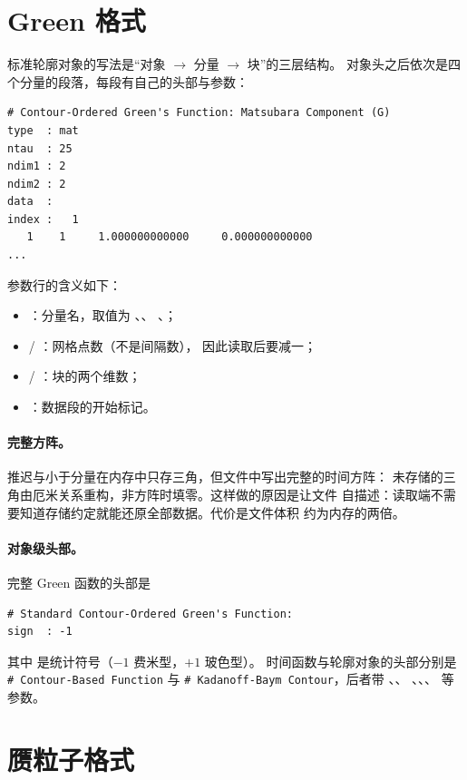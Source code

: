 \section{Green 格式}
\label{sec:green-format}

标准轮廓对象的写法是“对象 $\to$ 分量 $\to$ 块”的三层结构。
对象头之后依次是四个分量的段落，每段有自己的头部与参数：
\begin{lstlisting}[numbers=none]
# Contour-Ordered Green's Function: Matsubara Component (G)
type  : mat
ntau  : 25
ndim1 : 2
ndim2 : 2
data  :
index :   1
   1    1     1.000000000000     0.000000000000
...
\end{lstlisting}

参数行的含义如下：
\begin{itemize}
    \item {}：分量名，取值为 、、
          、；
    \item {} / ：网格点数（不是间隔数），
          因此读取后要减一；
    \item {} / ：块的两个维数；
    \item {}：数据段的开始标记。
\end{itemize}

\paragraph{完整方阵。}
推迟与小于分量在内存中只存三角，但文件中写出完整的时间方阵：
未存储的三角由厄米关系重构，非方阵时填零。这样做的原因是让文件
自描述：读取端不需要知道存储约定就能还原全部数据。代价是文件体积
约为内存的两倍。

\paragraph{对象级头部。}
完整 Green 函数的头部是
\begin{lstlisting}[numbers=none]
# Standard Contour-Ordered Green's Function:
sign  : -1
\end{lstlisting}
其中  是统计符号（$-1$ 费米型，$+1$ 玻色型）。
时间函数与轮廓对象的头部分别是 \texttt{\# Contour-Based Function} 与
\texttt{\# Kadanoff-Baym Contour}，后者带 、、
、、、 等参数。

\section{赝粒子格式}
\label{sec:pseudo-format}

